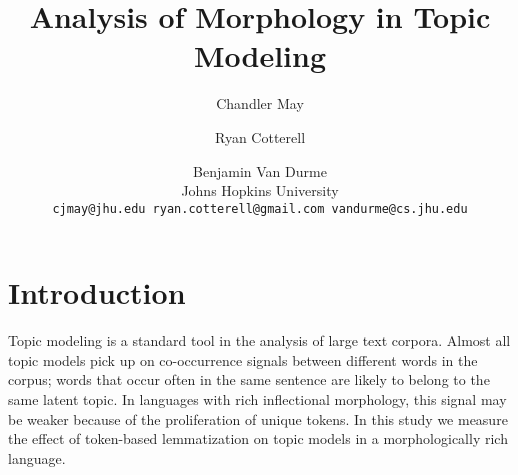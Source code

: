 \documentclass[11pt,letterpaper]{article}
\title{Analysis of Morphology in Topic Modeling}
\author{Chandler May \and Ryan Cotterell \and Benjamin Van Durme \\
    Johns Hopkins University \\
    \texttt{cjmay@jhu.edu ryan.cotterell@gmail.com
    vandurme@cs.jhu.edu}}
\date{}
\begin{document}
\maketitle

\begin{abstract}
    
\end{abstract}


\section{Introduction}\label{sec:introduction}

Topic modeling is a standard tool in the analysis of large
text corpora. Almost all topic models pick up on
co-occurrence signals between different words in the corpus;
words that occur often in the same sentence are likely to belong to
the same latent topic. In languages with rich inflectional
morphology, this signal may be weaker because of the proliferation of
unique tokens. In this study we measure the effect of token-based
lemmatization on topic models in a morphologically
rich language.
\end{document}
